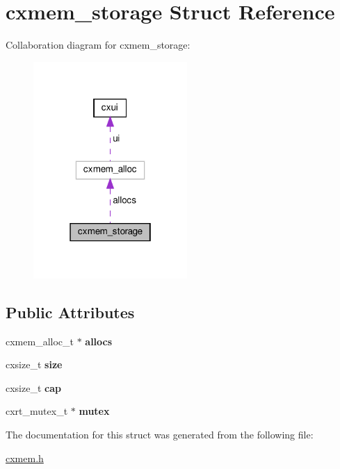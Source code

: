 \hypertarget{a00056}{}\section{cxmem\+\_\+storage Struct Reference}
\label{a00056}


Collaboration diagram for cxmem\+\_\+storage\+:
\nopagebreak
\begin{figure}[H]
\begin{center}
\leavevmode
\includegraphics[width=166pt]{a00054}
\end{center}
\end{figure}
\subsection*{Public Attributes}
\begin{DoxyCompactItemize}
\item 
\mbox{\label{a00056_a4663e63ea74aef2a831c26f29cec7147}} 
cxmem\+\_\+alloc\+\_\+t $\ast$ {\bfseries allocs}
\item 
\mbox{\label{a00056_ae0e190eb4581da409bcf0c1709852e9f}} 
cxsize\+\_\+t {\bfseries size}
\item 
\mbox{\label{a00056_a631394e8755be3e93cd90beeeb51ff3c}} 
cxsize\+\_\+t {\bfseries cap}
\item 
\mbox{\label{a00056_a9c77308d0cf6fc2016ebaaafc77e0402}} 
cxrt\+\_\+mutex\+\_\+t $\ast$ {\bfseries mutex}
\end{DoxyCompactItemize}


The documentation for this struct was generated from the following file\+:\begin{DoxyCompactItemize}
\item 
\hyperlink{a00017}{cxmem.\+h}\end{DoxyCompactItemize}
